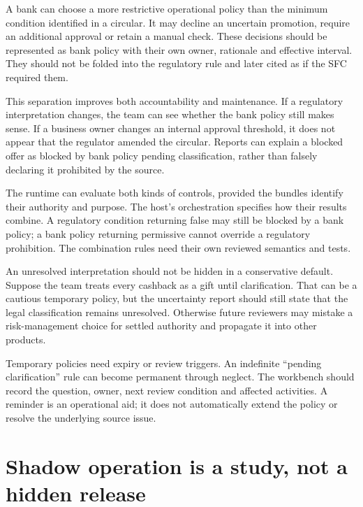 A bank can choose a more restrictive operational policy than the minimum condition
identified in a circular. It may decline an uncertain promotion, require an
additional approval or retain a manual check. These decisions should be represented
as bank policy with their own owner, rationale and effective interval. They should
not be folded into the regulatory rule and later cited as if the SFC required them.

This separation improves both accountability and maintenance. If a regulatory
interpretation changes, the team can see whether the bank policy still makes sense.
If a business owner changes an internal approval threshold, it does not appear
that the regulator amended the circular. Reports can explain a blocked offer as
blocked by bank policy pending classification, rather than falsely declaring it
prohibited by the source.


The runtime can evaluate both kinds of controls, provided the bundles identify
their authority and purpose. The host's orchestration specifies how their results
combine. A regulatory condition returning false may still be blocked by a bank
policy; a bank policy returning permissive cannot override a regulatory
prohibition. The combination rules need their own reviewed semantics and tests.

An unresolved interpretation should not be hidden in a conservative default.
Suppose the team treats every cashback as a gift until clarification. That can be
a cautious temporary policy, but the uncertainty report should still state that
the legal classification remains unresolved. Otherwise future reviewers may
mistake a risk-management choice for settled authority and propagate it into
other products.

Temporary policies need expiry or review triggers. An indefinite ``pending
clarification'' rule can become permanent through neglect. The workbench should
record the question, owner, next review condition and affected activities. A
reminder is an operational aid; it does not automatically extend the policy or
resolve the underlying source issue.

\section{Shadow operation is a study, not a hidden release}
\label{merge:M10:03}


